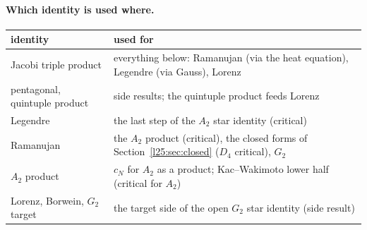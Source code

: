 \paragraph{Which identity is used where.}
\begin{center}\small
\begin{tabular}{p{}p{}}
\toprule
identity & used for\\
\midrule
Jacobi triple product & everything below: Ramanujan (via the heat equation), Legendre (via Gauss), Lorenz\\
pentagonal, quintuple product & side results; the quintuple product feeds Lorenz\\
Legendre & the last step of the $A_2$ star identity (critical)\\
Ramanujan & the $A_2$ product (critical), the closed forms of Section~\ref{l25:sec:closed} ($D_4$ critical), $G_2$\\
$A_2$ product & $c_N$ for $A_2$ as a product; Kac--Wakimoto lower half (critical for $A_2$)\\
Lorenz, Borwein, $G_2$ target & the target side of the open $G_2$ star identity (side result)\\
\bottomrule
\end{tabular}
\end{center}

